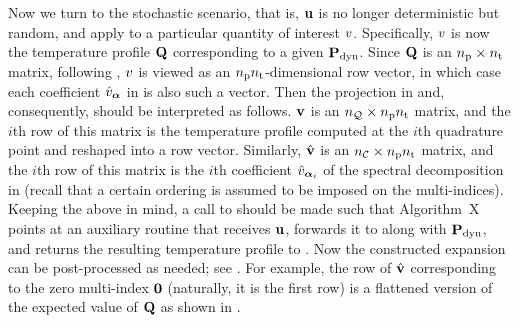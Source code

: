 Now we turn to the stochastic scenario, that is, $\mathbf{u}$ is no longer deterministic but random, and apply  to a particular quantity of interest $v$.
Specifically, $v$ is now the temperature profile $\mathbf{Q}$ corresponding to a given $\mathbf{P}_{\text{dyn}}$.
Since $\mathbf{Q}$ is an ${n_\text{p}} \times {n_\text{t}}$ matrix, following , $v$ is viewed as an ${n_\text{p}} {n_\text{t}}$-dimensional row vector, in which case each coefficient $\hat{v}_{\bm{\alpha}}$ in  is also such a vector.
Then the projection in  and, consequently,  should be interpreted as follows.
$\mathbf{v}$ is an ${n_\mathcal{Q}} \times {n_\text{p}} {n_\text{t}}$ matrix, and the $i$th row of this matrix is the temperature profile computed at the $i$th quadrature point and reshaped into a row vector.
Similarly, $\hat{\mathbf{v}}$ is an ${n_\mathcal{C}} \times {n_\text{p}} {n_\text{t}}$ matrix, and the $i$th row of this matrix is the $i$th coefficient $\hat{v}_{\bm{\alpha}_i}$ of the spectral decomposition in  (recall that a certain ordering is assumed to be imposed on the multi-indices).
Keeping the above in mind, a call to  should be made such that Algorithm~X points at an auxiliary routine that receives $\mathbf{u}$, forwards it to  along with $\mathbf{P}_{\text{dyn}}$, and returns the resulting temperature profile to .
Now the constructed expansion can be post-processed as needed; see .
For example, the row of $\hat{\mathbf{v}}$ corresponding to the zero multi-index $\mathbf{0}$ (naturally, it is the first row) is a flattened version of the expected value of $\mathbf{Q}$ as shown in .
